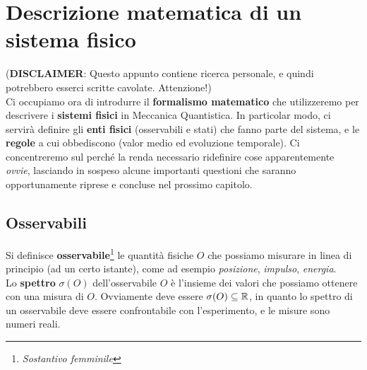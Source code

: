 \documentclass[FisicaTeorica.tex]{subfiles}
\begin{document}
\chapter{Descrizione matematica di un sistema fisico}
\vspace{-1em}
(\textbf{DISCLAIMER}: Questo appunto contiene ricerca personale, e quindi potrebbero esserci scritte cavolate. Attenzione!) \\ 
Ci occupiamo ora di introdurre il \textbf{formalismo matematico} che utilizzeremo per descrivere i \textbf{sistemi fisici} in Meccanica Quantistica. In particolar modo, ci servirà definire gli \textbf{enti fisici} (osservabili e stati) che fanno parte del sistema, e le \textbf{regole} a cui obbediscono (valor medio ed evoluzione temporale). Ci concentreremo sul perché la \MQ  renda necessario ridefinire cose apparentemente \textit{ovvie}, lasciando in sospeso alcune importanti questioni che saranno opportunamente riprese e concluse nel prossimo capitolo.\\
\section{Osservabili}
Si definisce \textbf{osservabile}\footnote{\textit{Sostantivo femminile}}  le quantità fisiche $O$ che possiamo misurare in linea di principio (ad un certo istante), come ad esempio \textit{posizione}, \textit{impulso}, \textit{energia}.\\
Lo \textbf{spettro} $\sigma(O)$ dell'osservabile $O$ è l'insieme dei valori che possiamo ottenere con una misura di $O$. Ovviamente deve essere $\sigma(O) \subseteq \mathbb{R}$, in quanto lo spettro di un osservabile deve essere confrontabile con l'esperimento, e le misure sono numeri reali.\\
\end{document}

